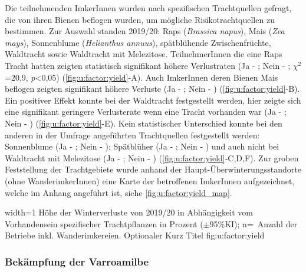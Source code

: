 Die teilnehmenden ImkerInnen wurden nach spezifischen Trachtquellen gefragt, die von ihren Bienen beflogen wurden, um mögliche Risikotrachtquellen zu bestimmen. Zur Auswahl standen 2019/20: Raps (\textit{Brassica napus}), Mais (\textit{Zea mays}), Sonnenblume (\textit{Helianthus annuus}), spätblühende Zwischenfrüchte, Waldtracht sowie Waldtracht mit Melezitose.
\newline
TeilnehmerInnen die eine Raps Tracht hatten zeigten statistisch signifikant höhere Verlustraten (Ja - ; Nein - ; $\chi^{2}$=20,9, \textit{p}<0,05) (\cref{fig:u:factor:yield}-A). Auch ImkerInnen deren Bienen Mais beflogen zeigten signifikant höhere Verluste (Ja - ; Nein - ) (\cref{fig:u:factor:yield}-B).
\newline
Ein positiver Effekt konnte bei der Waldtracht festgestellt werden, hier zeigte sich eine signifikant geringere Verlusterate wenn eine Tracht vorhanden war (Ja - ; Nein - ) (\cref{fig:u:factor:yield}-E).
\newline
Kein statistischer Unterschied konnte bei den anderen in der Umfrage angeführten Trachtquellen festgestellt werden: Sonnenblume (Ja - ; Nein - ); Spätblüher (Ja - ; Nein - ) und auch nicht bei Waldtracht mit Melezitose (Ja - ; Nein - ) (\cref{fig:u:factor:yield}-C,D,F).
\newline
Zur groben Feststellung der Trachtgebiete wurde anhand der Haupt-Überwinterungsstandorte (ohne WanderimkerInnen) eine Karte der betroffenen ImkerInnen aufgezeichnet, welche im Anhang angeführt ist, siehe \cref{fig:u:factor:yield_map}.

{width=1\textwidth} %
{Höhe der Winterverluste von 2019/20 in Abhängigkeit vom Vorhandensein spezifischer Trachtpflanzen in Prozent ($\pm$95\%KI); n=~Anzahl der Betriebe inkl. Wanderimkereien.} %
{Optionaler Kurz Titel} %
{fig:u:factor:yield} %

\subsubsection{Bekämpfung der Varroamilbe}
\label{ss:baekempfung_varroa:U}

